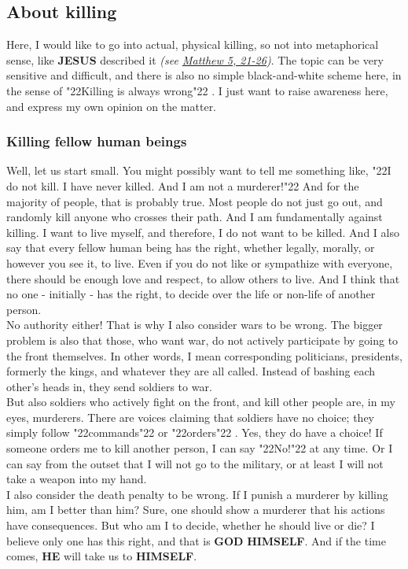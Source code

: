 \documentclass[12pt,a5paper]{article}
\newcommand{\God}[0]{\textbf{GOD}}
\newcommand{\He}[0]{\textbf{HE}}
\newcommand{\Himself}[0]{\textbf{HIMSELF}}
\newcommand{\Jesus}[0]{\textbf{JESUS}}
\newcommand{\q}[1]{\char"22{#1}\char"22 }
\begin{document}
	\subsection{About killing} \label{VomToeten}
		Here,
		I would like to go into actual,
		physical killing,
		so not into metaphorical sense,
		like {\Jesus} described it
		\textit{(see \href{https://www.die-bibel.de/bibeln/online-bibeln/lesen/ESV/MAT.5/Matthew-5}{Matthew 5, 21-26})}.
		The topic can be very sensitive and difficult,
		and there is also no simple black-and-white scheme here,
		in the sense of \q{Killing is always wrong}.
		I just want to raise awareness here,
		and express my own opinion on the matter.

	\subsubsection{Killing fellow human beings}
		Well,
		let us start small.
		You might possibly want to tell me something like,
		\q{I do not kill.
		I have never killed.
		And I am not a murderer!}
		And for the majority of people,
		that is probably true.
		Most people do not just go out,
		and randomly kill anyone who crosses their path.
		And I am fundamentally against killing.
		I want to live myself,
		and therefore,
		I do not want to be killed.
		And I also say that every fellow human being has the right,
		whether legally,
		morally,
		or however you see it,
		to live.
		Even if you do not like or sympathize with everyone,
		there should be enough love and respect,
		to allow others to live.
		And I think that no one - initially - has the right,
		to decide over the life or non-life of another person.
		\\
		No authority either!
		That is why I also consider wars to be wrong.
		The bigger problem is also that those,
		who want war,
		do not actively participate by going to the front themselves.
		In other words,
		I mean corresponding politicians,
		presidents,
		formerly the kings,
		and whatever they are all called.
		Instead of bashing each other's heads in,
		they send soldiers to war.
		\\
		But also soldiers who actively fight on the front,
		and kill other people are,
		in my eyes,
		murderers.
		There are voices claiming that soldiers have no choice;
		they simply follow \q{commands} or \q{orders}.
		Yes,
		they do have a choice!
		If someone orders me to kill another person,
		I can say \q{No!} at any time.
		Or I can say from the outset that I will not go to the military,
		or at least I will not take a weapon into my hand.
		\\
		I also consider the death penalty to be wrong.
		If I punish a murderer by killing him,
		am I better than him?
		Sure,
		one should show a murderer that his actions have consequences.
		But who am I to decide,
		whether he should live or die?
		I believe only one has this right,
		and that is {\God} {\Himself}.
		And if the time comes,
		{\He} will take us to {\Himself}.
		
\end{document}
